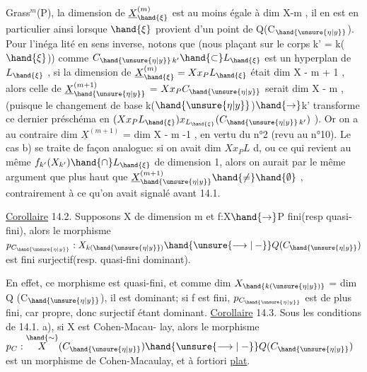 
Grass$^{m}$(P), la dimension de $\underline{X}^{(m)}_{\hand{\xi}}$ est au moins égale à dim X-m , il en est
en particulier ainsi lorsque $\hand{\xi}$ provient d'un point de Q(C$_{\hand{\unsure{\eta|y}}}$). Pour l'inéga
lité en sens inverse, notons que (nous plaçant sur le corps k' = k($\hand{\xi}$))
comme $C_{\hand{\unsure{\eta|y}}\,k'} \hand{\subset} L_{\hand{\xi}}$ est  un hyperplan de $L_{\hand{\xi}}$ , si la dimension de
$\underline{X}^{(m)}_{\hand{\xi}} = Xx_{P}L_{\hand{\xi}}$ était \hand{$\geqslant$} dim X - m + 1 , alors celle de $\underline{X}^{(m+1)}_{\hand{\unsure{\eta|y}}}$ =
$Xx_{P}C_{\hand{\unsure{\eta|y}}}$ serait \hand{$\geqslant$} dim X - m , (puisque le changement de base k($\hand{\unsure{\eta|y}}$)$\hand{\to}$k'
transforme ce dernier préschéma en $(Xx_{P}L_{\hand{\xi}})x_{L_{\hand{\xi}}}(C_{\hand{\unsure{\eta|y}}\,k'})$ ). Or on a au
contraire  dim $\underline{X}^{(m+1)}$ = dim X - m -1 
, en vertu du n°2 (revu au n°10).
Le cas b)  se traite
de façon analogue: si on avait dim $Xx_{P}L$ \hand{$\geqslant$} d,  ou
ce qui revient au même  $f_{k'}(X_{k'}) \hand{\cap} L_{\hand{\xi}}$ de dimension \hand{$\geqslant$}1,
alors on aurait par le même argument que plus  haut que
$\underline{X}^{(m+1)}_{\hand{\unsure{\eta|y}}} \hand{\neq} \hand{\emptyset}$ , contrairement à ce qu'on avait signalé avant 14.1.

\uline{Corollaire} 14.2. Supposons X de dimension m et f:X$\hand{\to}$P fini(resp quasi-fini), alors
le morphisme $p_{C_{\hand{\unsure{\eta|y}}}} : X_{k(\hand{\unsure{\eta|y}})} \hand{\unsure{\longrightarrow|\relbar}} Q(C_{\hand{\unsure{\eta|y}}})$ est fini surjectif(resp. quasi-fini
dominant).

En effet, ce morphisme est quasi-fini, et comme dim $X_{\hand{k(\unsure{\eta|y})}}$ = dim Q (C$_{\hand{\unsure{\eta|y}}}$), il est
dominant;  si f est fini, $p_{C_{\hand{\unsure{\eta|y}}}}$ est de plus fini,
 car propre, donc surjectif étant dominant.
\uline{Corollaire} 14.3. Sous les conditions de 14.1. a), si X est Cohen-Macau-%
lay, alors le morphisme $p_{C} : \overset{\hand{\sim}}{X}(C_{\hand{\unsure{\eta|y}}}) \hand{\unsure{\longrightarrow|\relbar}} Q(C_{\hand{\unsure{\eta|y}}})$ est un morphisme de
Cohen-Macaulay, et à fortiori \uline{plat}.

